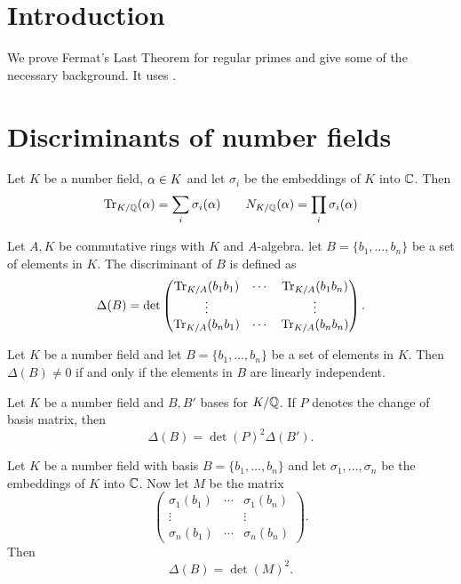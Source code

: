 	\maketitle
\tableofcontents
\section{Introduction}
We prove Fermat's Last Theorem for regular primes and give some of the necessary background. It uses \cite{Samuel,marcus,washington}.

\section{Discriminants of number fields}
\begin{lemma}\label{lemma:alt_definition_of_norm_and_trace}
	Let $K$ be a number field, $\alpha \in K$ and let $\sigma_i$ be the embeddings of $K$ into $\mathbb{C}$. Then \[\operatorname{Tr}_{K/\mathbb{Q}}(\alpha) =\sum_i \sigma_i(\alpha) \qquad N_{K/\mathbb{Q}}(\alpha)=\prod_i \sigma_i(\alpha)  \]
\end{lemma}

\begin{definition}\label{defn_of_disc}
	Let $A,K$ be commutative rings with $K$ and $A$-algebra. let $B=\{b_1,\dots,b_n\}$ be a set of elements in $K$. The discriminant of $B$ is defined as \[\Delta(B)=  \det \left (\begin{matrix} \operatorname{Tr}_{K/A}(b_1b_1) &\cdots& \operatorname{Tr}_{K/A}(b_1b_n)\\ \vdots & & \vdots \\  \operatorname{Tr}_{K/A}(b_nb_1) &\cdots& \operatorname{Tr}_{K/A}(b_nb_n)
	\end{matrix} \right ).\]
\end{definition}

\begin{lemma}\label{lem:lin_indep_iff_disc_ne_zero}
	Let $K$ be a number field and let $B=\{b_1,\dots,b_n\}$ be a set of elements in $K$. Then $\Delta(B) \neq 0$ if and only if the elements in $B$ are linearly independent.
\end{lemma}

\begin{lemma}\label{lem:disc_change_of_basis}
	Let $K$ be a number field and $B,B'$ bases for $K/\mathbb{Q}$. If $P$ denotes the change of basis matrix, then \[\Delta(B)=\det(P)^2 \Delta(B').\]
\end{lemma}

\begin{lemma}\label{lemma:disc_via_embs}
	Let $K$ be a number field with basis $B=\{b_1,\dots,b_n\}$ and let $\sigma_1,\dots,\sigma_n$ be the embeddings of $K$ into $\mathbb{C}$. Now let $M$ be the matrix  \[\left (\begin{matrix} \sigma_1(b_1) &\cdots& \sigma_1(b_n)\\ \vdots & & \vdots \\  \sigma_n(b_1) &\cdots& \sigma_n(b_n)
	\end{matrix} \right ).\] Then \[\Delta(B)=\det(M)^2.\]
\end{lemma}


